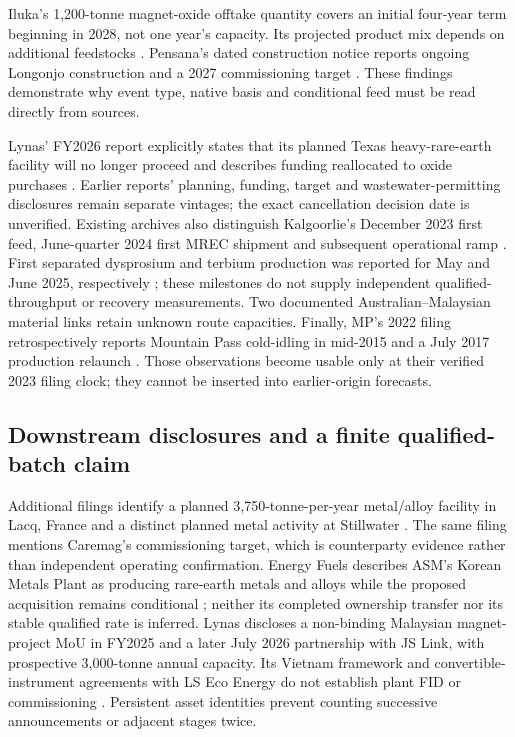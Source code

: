 \documentclass[11pt]{article}
\begin{document}
Iluka's 1,200-tonne magnet-oxide offtake quantity covers an initial four-year term beginning in 2028, not one year's capacity. Its projected product mix depends on additional feedstocks \citep{Iluka2026}. Pensana's dated construction notice reports ongoing Longonjo construction and a 2027 commissioning target \citep{Pensana2026}. These findings demonstrate why event type, native basis and conditional feed must be read directly from sources.

Lynas' FY2026 report explicitly states that its planned Texas heavy-rare-earth facility will no longer proceed and describes funding reallocated to oxide purchases \citep{Lynas2026}. Earlier reports' planning, funding, target and wastewater-permitting disclosures remain separate vintages; the exact cancellation decision date is unverified. Existing archives also distinguish Kalgoorlie's December 2023 first feed, June-quarter 2024 first MREC shipment and subsequent operational ramp \citep{Lynas2024Q2,Lynas2024Q4}. First separated dysprosium and terbium production was reported for May and June 2025, respectively \citep{Lynas2025Q4}; these milestones do not supply independent qualified-throughput or recovery measurements. Two documented Australian--Malaysian material links retain unknown route capacities. Finally, MP's 2022 filing retrospectively reports Mountain Pass cold-idling in mid-2015 and a July 2017 production relaunch \citep{MP2022}. Those observations become usable only at their verified 2023 filing clock; they cannot be inserted into earlier-origin forecasts.

\subsection{Downstream disclosures and a finite qualified-batch claim}
Additional filings identify a planned 3,750-tonne-per-year metal/alloy facility in Lacq, France and a distinct planned metal activity at Stillwater \citep{USARE2025}. The same filing mentions Caremag's commissioning target, which is counterparty evidence rather than independent operating confirmation. Energy Fuels describes ASM's Korean Metals Plant as producing rare-earth metals and alloys while the proposed acquisition remains conditional \citep{EF2025}; neither its completed ownership transfer nor its stable qualified rate is inferred. Lynas discloses a non-binding Malaysian magnet-project MoU in FY2025 and a later July 2026 partnership with JS Link, with prospective 3,000-tonne annual capacity. Its Vietnam framework and convertible-instrument agreements with LS Eco Energy do not establish plant FID or commissioning \citep{Lynas2025,Lynas2026}. Persistent asset identities prevent counting successive announcements or adjacent stages twice.
\end{document}

